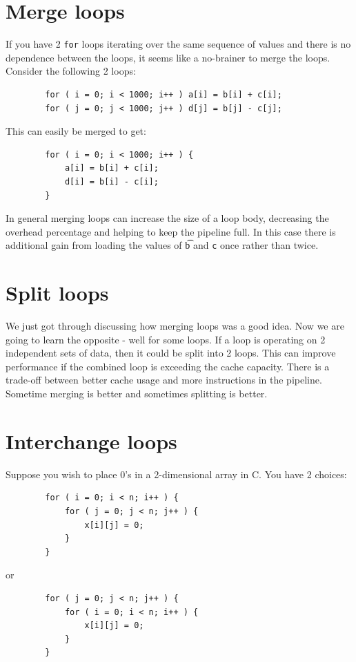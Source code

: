 \documentclass[11pt,b5paper]{book}
\begin{document}
\section{Merge loops}

If you have 2 {\tt for} loops iterating over the same sequence of values and
there is no dependence between the loops, it seems like a no-brainer to merge
the loops.
Consider the following 2 loops:
\begin{verbatim}
        for ( i = 0; i < 1000; i++ ) a[i] = b[i] + c[i];
        for ( j = 0; j < 1000; j++ ) d[j] = b[j] - c[j];
\end{verbatim}
This can easily be merged to get:
\begin{verbatim}
        for ( i = 0; i < 1000; i++ ) {
            a[i] = b[i] + c[i];
            d[i] = b[i] - c[i];
        }
\end{verbatim}

In general merging loops can increase the size of a loop body, decreasing
the overhead percentage and helping to keep the pipeline full.
In this case there is additional gain from loading the values of {\t b} and
{\tt c} once rather than twice.

\section{Split loops}

We just got through discussing how merging loops was a good idea.
Now we are going to learn the opposite - well for some loops.
If a loop is operating on 2 independent sets of data, then it could be
split into 2 loops.
This can improve performance if the combined loop is exceeding the cache
capacity.
There is a trade-off between better cache usage and more instructions in the
pipeline.
Sometime merging is better and sometimes splitting is better.

\section{Interchange loops}

Suppose you wish to place 0's in a 2-dimensional array in C.  You have
2 choices:
\begin{verbatim}
        for ( i = 0; i < n; i++ ) {
            for ( j = 0; j < n; j++ ) {
                x[i][j] = 0;
            }
        }
\end{verbatim}
or
\begin{verbatim}
        for ( j = 0; j < n; j++ ) {
            for ( i = 0; i < n; i++ ) {
                x[i][j] = 0;
            }
        }
\end{verbatim}
\end{document}
